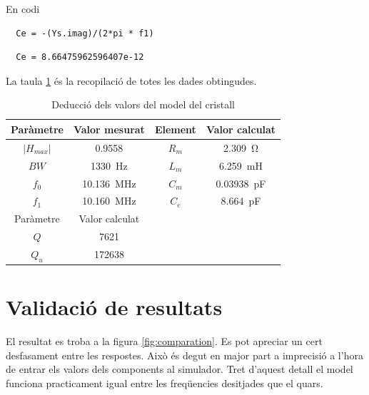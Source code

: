 \documentclass[catalan, a4paper, nobib]{tufte-handout}
\begin{document}
\newthought{} En codi

\begin{verbatim}
  Ce = -(Ys.imag)/(2*pi * f1)
\end{verbatim}

\begin{verbatim}
  Ce = 8.66475962596407e-12
\end{verbatim}

\newthought{} La taula \ref{table:all_values} és la recopilació de totes les dades obtingudes.

\begin{table}
  \begin{center}
    \begin{tabular}{@{}cc|cc@{}}
      \toprule
      Paràmetre & Valor mesurat & Element & Valor calculat \\      
      \midrule
      $|H_{max}|$ & \num{0.9558} & $R_m$ & \qty{2.309}{\ohm} \\
      $BW$ & \qty{1330}{\hertz} & $L_m$ & \qty{6.259}{\milli\henry} \\
      $f_0$ & \qty{10.136}{\mega\hertz} & $C_m$ & \qty{0.03938}{\pico\farad} \\
      $f_1$ & \qty{10.160}{\mega\hertz} & $C_e$ & \qty{8.664}{\pico\farad} \\
      \bottomrule
      Paràmetre & Valor calculat & & \\
      \midrule
      $Q$ & \num{7621} && \\
      $Q_u$ & \num{172638} && \\
      \bottomrule
    \end{tabular}
  \end{center}
  \caption{Deducció dels valors del model del cristall}
  \label{table:all_values}
\end{table}

\section{Validació de resultats}

 El resultat es troba a la figura \ref{fig:comparation}. Es pot apreciar un cert desfasament entre les respostes. Això és degut en major part a imprecisió a l'hora de entrar els valors dels components al simulador. Tret d'aquest detall el model funciona practicament igual entre les freqüencies desitjades que el quars.
\end{document}

